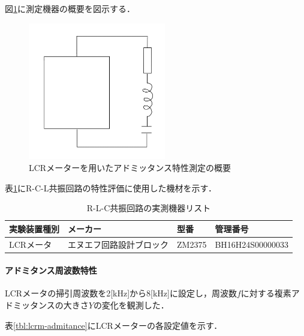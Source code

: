 \documentclass[dvipdfmx,titlepage,a4j]{jsarticle}  %
\numberwithin{equation}{section}
\begin{document}
図\ref{fig:fig7-meter.jpg}に測定機器の概要を図示する．
\begin{figure}[H]
  \centering
  \includegraphics[width=6cm]{../fig/fig7-meter.jpg}
  \caption{LCRメーターを用いたアドミッタンス特性測定の概要}
  \label{fig:fig7-meter.jpg}
\end{figure}

表\ref{tbl:r-l-c-list}にR-C-L共振回路の特性評価に使用した機材を示す．

\begin{table}[htbp]
  \caption{R-L-C共振回路の実測機器リスト}
  \begin{center}
    \begin{tabular}{l|l|l|l}
      \hline
      実験装置種別 & メーカー                 & 型番   & 管理番号         \\ \hline \hline
      LCRメータ    & エヌエフ回路設計ブロック & ZM2375 & BH16H24S00000033 \\ \hline
    \end{tabular}
  \end{center}
  \label{tbl:r-l-c-list}
\end{table}


\paragraph{アドミタンス周波数特性}
LCRメータの掃引周波数を2[kHz]から8[kHz]に設定し，周波数$f$に対する複素アドミッタンスの大きさ$Y$の変化を観測した．

表\ref{tbl:lcrm-admitance}にLCRメーターの各設定値を示す．
\end{document}
